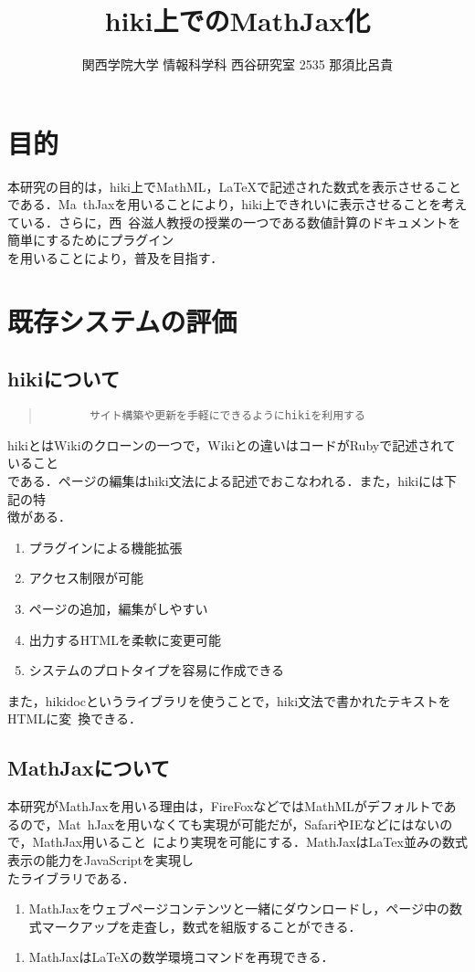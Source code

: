 \documentclass[10pt,a4j,twocolumn]{jsarticle}
\begin{document}
\title{hiki上でのMathJax化}
\author{関西学院大学 情報科学科 西谷研究室 2535 那須比呂貴}
\date{}
\maketitle
\section{目的}
本研究の目的は，hiki上でMathML，LaTeXで記述された数式を表示させることである．Ma\
thJaxを用いることにより，hiki上できれいに表示させることを考えている．さらに，西\
谷滋人教授の授業の一つである数値計算のドキュメントを簡単にするためにプラグイン\\
を用いることにより，普及を目指す．

\section{既存システムの評価}
\subsection{hikiについて}\begin{quote}\begin{verbatim}
       サイト構築や更新を手軽にできるようにhikiを利用する
\end{verbatim}\end{quote}
hikiとはWikiのクローンの一つで，Wikiとの違いはコードがRubyで記述されていること\\
である．ページの編集はhiki文法による記述でおこなわれる．また，hikiには下記の特\\
徴がある．
\begin{enumerate}
\item プラグインによる機能拡張
\item アクセス制限が可能
\item ページの追加，編集がしやすい
\item 出力するHTMLを柔軟に変更可能
\item システムのプロトタイプを容易に作成できる
\end{enumerate}
また，hikidocというライブラリを使うことで，hiki文法で書かれたテキストをHTMLに変\
換できる．

\subsection{MathJaxについて}
本研究がMathJaxを用いる理由は，FireFoxなどではMathMLがデフォルトであるので，Mat\
hJaxを用いなくても実現が可能だが，SafariやIEなどにはないので，MathJax用いること\
により実現を可能にする．MathJaxはLaTex並みの数式表示の能力をJavaScriptを実現し\\
たライブラリである．
\begin{enumerate}
\item MathJaxをウェブページコンテンツと一緒にダウンロードし，ページ中の数式マークアップを走査し，数式を組版することができる．
\end{enumerate}\begin{enumerate}
\item MathJaxはLaTeXの数学環境コマンドを再現できる．
\end{enumerate}
\end{document}
